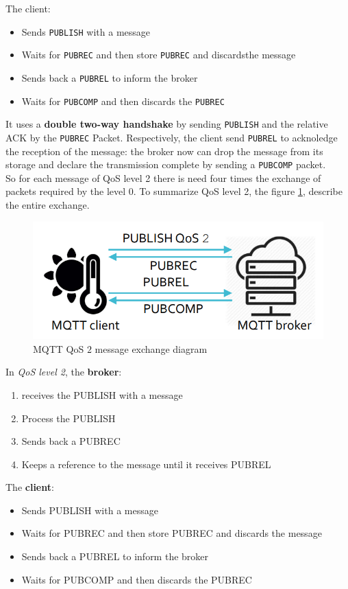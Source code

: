 \documentclass[10pt,a4paper]{report}
\theoremstyle{definition}
\begin{document}
The client:
\begin{itemize}
	\item Sends \texttt{PUBLISH} with a message
	\item Waits for \texttt{PUBREC} and then store \texttt{PUBREC} and discardsthe message
	\item Sends back a \texttt{PUBREL} to inform the broker 
	\item Waits for \texttt{PUBCOMP} and then discards the \texttt{PUBREC}
\end{itemize}



It uses a \textbf{double two-way handshake} by sending \texttt{PUBLISH} and the relative ACK by the \texttt{PUBREC} Packet. Respectively, the client send \texttt{PUBREL} to acknoledge the reception of the message: the broker now can drop the message from its storage and declare the transmission complete by sending a \texttt{PUBCOMP} packet.\\
So for each message of QoS level 2 there is need four times the exchange of packets required by the level 0.
To summarize QoS level 2, the figure \ref{mqtt-qos-2}, describe the entire exchange.
\begin{figure}[h]
	\centering
	\includegraphics[scale=0.50]{images/Pasted image 20230304093804.png}
	\caption{MQTT QoS $2$ message exchange diagram}\label{mqtt-qos-2}\end{figure}

In \textit{QoS level 2}, the \textbf{broker}:
\begin{enumerate}
	\item 
	receives the PUBLISH with a message
	\item 
	Process the PUBLISH
	\item 
	Sends back a PUBREC
	\item 
	Keeps a reference to the message until it receives PUBREL
\end{enumerate}

The \textbf{client}:
\begin{itemize}
	\item 
Sends PUBLISH with a message
\item 
Waits for PUBREC and then store PUBREC and discards the message
\item 
Sends back a PUBREL to inform the broker
\item 
Waits for PUBCOMP and then discards the PUBREC	
\end{itemize}
\end{document}
